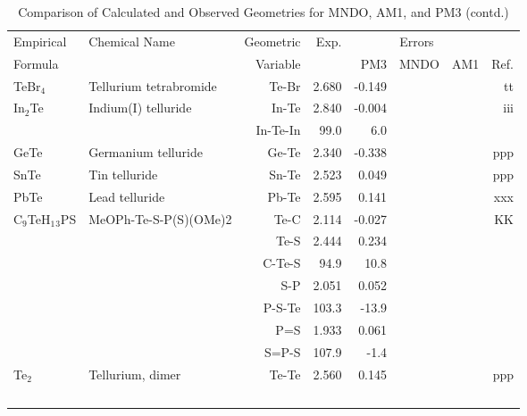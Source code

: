 \begin{table}
\caption{\label{geotaby}Comparison of Calculated and Observed Geometries for 
MNDO, AM1, and PM3 (contd.)}
\begin{center}
\compresstable
\begin{tabular}{llrrrrrr}
 Empirical  & Chemical Name &  Geometric &  Exp. & \multicolumn{3}{c}{Errors} & \\
  Formula   &               &  Variable &        & PM3  & MNDO  &  AM1 & Ref.\\
\hline
 TeBr$_4$       & Tellurium tetrabromide             &Te-Br          &     2.680   &    -0.149 &  &  &    tt \\
 In$_2$Te       & Indium(I) telluride                &In-Te          &     2.840   &    -0.004 &  &  &   iii \\
             &                                    &In-Te-In     &      99.0   &       6.0 &  &    &       \\
 GeTe        & Germanium telluride                &Ge-Te          &     2.340   &    -0.338 &  &  &   ppp \\
 SnTe        & Tin telluride                      &Sn-Te          &     2.523   &     0.049 &  &  &   ppp \\
 PbTe        & Lead telluride                     &Pb-Te          &     2.595   &     0.141 &  &  &   xxx \\
 C$_9$TeH$_1$$_3$PS   & MeOPh-Te-S-P(S)(OMe)2              &Te-C           &     2.114   &    -0.027 &  &  &    KK \\
             &                                    &Te-S           &     2.444   &     0.234 &  &  &       \\
             &                                    &C-Te-S       &      94.9   &      10.8 &  &    &       \\
             &                                    &S-P            &     2.051   &     0.052 &  &  &       \\
             &                                    &P-S-Te       &     103.3   &     -13.9 &  &    &       \\
             &                                    &P=S            &     1.933   &     0.061 &  &  &       \\
             &                                    &S=P-S        &     107.9   &      -1.4 &  &    &       \\
 Te$_2$         & Tellurium, dimer                   &Te-Te          &     2.560   &     0.145 &  &  &   ppp \\
$$
\end{tabular}
\end{center}
\end{table}
